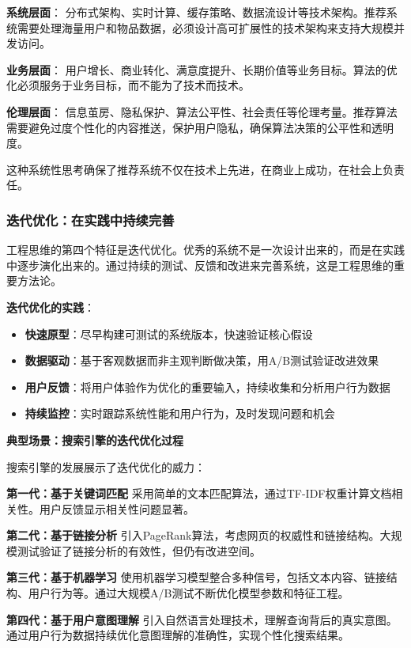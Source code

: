 \textbf{系统层面}：
分布式架构、实时计算、缓存策略、数据流设计等技术架构。推荐系统需要处理海量用户和物品数据，必须设计高可扩展性的技术架构来支持大规模并发访问。

\textbf{业务层面}：
用户增长、商业转化、满意度提升、长期价值等业务目标。算法的优化必须服务于业务目标，而不能为了技术而技术。

\textbf{伦理层面}：
信息茧房、隐私保护、算法公平性、社会责任等伦理考量。推荐算法需要避免过度个性化的内容推送，保护用户隐私，确保算法决策的公平性和透明度。

这种系统性思考确保了推荐系统不仅在技术上先进，在商业上成功，在社会上负责任。

\subsubsection{迭代优化：在实践中持续完善}

工程思维的第四个特征是迭代优化。优秀的系统不是一次设计出来的，而是在实践中逐步演化出来的。通过持续的测试、反馈和改进来完善系统，这是工程思维的重要方法论。

\textbf{迭代优化的实践}：
\begin{itemize}
\item \textbf{快速原型}：尽早构建可测试的系统版本，快速验证核心假设
\item \textbf{数据驱动}：基于客观数据而非主观判断做决策，用A/B测试验证改进效果
\item \textbf{用户反馈}：将用户体验作为优化的重要输入，持续收集和分析用户行为数据
\item \textbf{持续监控}：实时跟踪系统性能和用户行为，及时发现问题和机会
\end{itemize}

\textbf{典型场景：搜索引擎的迭代优化过程}

搜索引擎的发展展示了迭代优化的威力：

\textbf{第一代：基于关键词匹配}
采用简单的文本匹配算法，通过TF-IDF权重计算文档相关性。用户反馈显示相关性问题显著。

\textbf{第二代：基于链接分析}
引入PageRank算法，考虑网页的权威性和链接结构。大规模测试验证了链接分析的有效性，但仍有改进空间。

\textbf{第三代：基于机器学习}
使用机器学习模型整合多种信号，包括文本内容、链接结构、用户行为等。通过大规模A/B测试不断优化模型参数和特征工程。

\textbf{第四代：基于用户意图理解}
引入自然语言处理技术，理解查询背后的真实意图。通过用户行为数据持续优化意图理解的准确性，实现个性化搜索结果。

